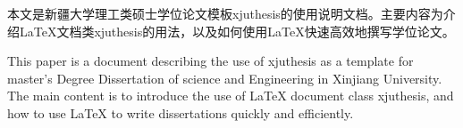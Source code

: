\author{刘庆飞}%
\maketitle%
\setcounter{page}{1}%

本文是新疆大学理工类硕士学位论文模板xjuthesis的使用说明文档。主要内容为介绍\LaTeX{}文档类xjuthesis的用法，以及如何使用\LaTeX{}快速高效地撰写学位论文。



This paper is a document describing the use of xjuthesis as a template for master's Degree Dissertation of science and Engineering in Xinjiang University. The main content is to introduce the use of \LaTeX{} document class xjuthesis, and how to use \LaTeX{} to write dissertations quickly and efficiently.

